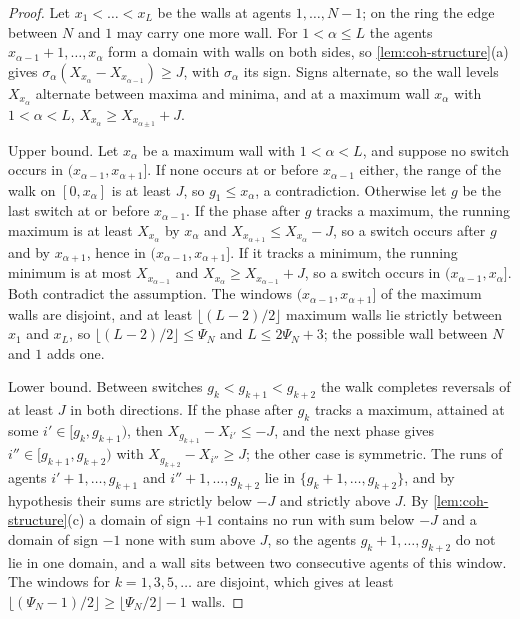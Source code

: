 \begin{proof}
Let $x_1<\dots<x_L$ be the walls at agents $1,\dots,N-1$; on the ring the edge between $N$ and $1$ may carry one more wall. For $1<\alpha\le L$ the agents $x_{\alpha-1}+1,\dots,x_\alpha$ form a domain with walls on both sides, so \cref{lem:coh-structure}(a) gives $\sigma_\alpha(X_{x_\alpha}-X_{x_{\alpha-1}})\ge J$, with $\sigma_\alpha$ its sign. Signs alternate, so the wall levels $X_{x_\alpha}$ alternate between maxima and minima, and at a maximum wall $x_\alpha$ with $1<\alpha<L$, $X_{x_\alpha}\ge X_{x_{\alpha\pm1}}+J$.

Upper bound. Let $x_\alpha$ be a maximum wall with $1<\alpha<L$, and suppose no switch occurs in $(x_{\alpha-1},x_{\alpha+1}]$. If none occurs at or before $x_{\alpha-1}$ either, the range of the walk on $[0,x_\alpha]$ is at least $J$, so $g_1\le x_\alpha$, a contradiction. Otherwise let $g$ be the last switch at or before $x_{\alpha-1}$. If the phase after $g$ tracks a maximum, the running maximum is at least $X_{x_\alpha}$ by $x_\alpha$ and $X_{x_{\alpha+1}}\le X_{x_\alpha}-J$, so a switch occurs after $g$ and by $x_{\alpha+1}$, hence in $(x_{\alpha-1},x_{\alpha+1}]$. If it tracks a minimum, the running minimum is at most $X_{x_{\alpha-1}}$ and $X_{x_\alpha}\ge X_{x_{\alpha-1}}+J$, so a switch occurs in $(x_{\alpha-1},x_\alpha]$. Both contradict the assumption. The windows $(x_{\alpha-1},x_{\alpha+1}]$ of the maximum walls are disjoint, and at least $\lfloor(L-2)/2\rfloor$ maximum walls lie strictly between $x_1$ and $x_L$, so $\lfloor(L-2)/2\rfloor\le\Psi_N$ and $L\le2\Psi_N+3$; the possible wall between $N$ and $1$ adds one.

Lower bound. Between switches $g_k<g_{k+1}<g_{k+2}$ the walk completes reversals of at least $J$ in both directions. If the phase after $g_k$ tracks a maximum, attained at some $i'\in[g_k,g_{k+1})$, then $X_{g_{k+1}}-X_{i'}\le-J$, and the next phase gives $i''\in[g_{k+1},g_{k+2})$ with $X_{g_{k+2}}-X_{i''}\ge J$; the other case is symmetric. The runs of agents $i'+1,\dots,g_{k+1}$ and $i''+1,\dots,g_{k+2}$ lie in $\{g_k+1,\dots,g_{k+2}\}$, and by hypothesis their sums are strictly below $-J$ and strictly above $J$. By \cref{lem:coh-structure}(c) a domain of sign $+1$ contains no run with sum below $-J$ and a domain of sign $-1$ none with sum above $J$, so the agents $g_k+1,\dots,g_{k+2}$ do not lie in one domain, and a wall sits between two consecutive agents of this window. The windows for $k=1,3,5,\dots$ are disjoint, which gives at least $\lfloor(\Psi_N-1)/2\rfloor\ge\lfloor\Psi_N/2\rfloor-1$ walls.
\end{proof}

